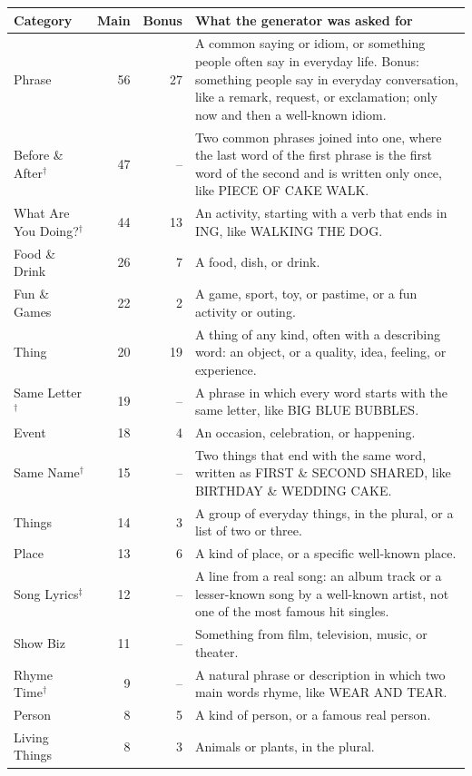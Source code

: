 \small
\begin{longtable}{lrrp{}}
\toprule
Category & Main & Bonus & What the generator was asked for \\
\midrule
\endhead
Phrase & 56 & 27 & A common saying or idiom, or something people often say in everyday life. Bonus: something people say in everyday conversation, like a remark, request, or exclamation; only now and then a well-known idiom. \\
Before \& After$^\dagger$ & 47 & -- & Two common phrases joined into one, where the last word of the first phrase is the first word of the second and is written only once, like PIECE OF CAKE WALK. \\
What Are You Doing?$^\dagger$ & 44 & 13 & An activity, starting with a verb that ends in ING, like WALKING THE DOG. \\
Food \& Drink & 26 & 7 & A food, dish, or drink. \\
Fun \& Games & 22 & 2 & A game, sport, toy, or pastime, or a fun activity or outing. \\
Thing & 20 & 19 & A thing of any kind, often with a describing word: an object, or a quality, idea, feeling, or experience. \\
Same Letter$^\dagger$ & 19 & -- & A phrase in which every word starts with the same letter, like BIG BLUE BUBBLES. \\
Event & 18 & 4 & An occasion, celebration, or happening. \\
Same Name$^\dagger$ & 15 & -- & Two things that end with the same word, written as FIRST \& SECOND SHARED, like BIRTHDAY \& WEDDING CAKE. \\
Things & 14 & 3 & A group of everyday things, in the plural, or a list of two or three. \\
Place & 13 & 6 & A kind of place, or a specific well-known place. \\
Song Lyrics$^\ddagger$ & 12 & -- & A line from a real song: an album track or a lesser-known song by a well-known artist, not one of the most famous hit singles. \\
Show Biz & 11 & -- & Something from film, television, music, or theater. \\
Rhyme Time$^\dagger$ & 9 & -- & A natural phrase or description in which two main words rhyme, like WEAR AND TEAR. \\
Person & 8 & 5 & A kind of person, or a famous real person. \\
Living Things & 8 & 3 & Animals or plants, in the plural. \\

\end{longtable}
